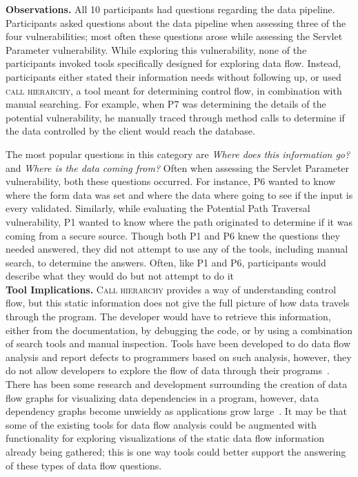 \documentclass[conference]{IEEEtran}
\begin{document}
\noindent\textbf{Observations.}
All 10 participants had questions regarding the data pipeline.
Participants asked questions about the data pipeline when assessing three of the four vulnerabilities; most often these questions arose while assessing the Servlet Parameter vulnerability. 
While exploring this vulnerability, none of the participants invoked tools specifically designed for exploring data flow. 
Instead, participants either stated their information needs without following up, or used \textsc{call hierarchy}, a tool meant for determining control flow, in combination with manual searching.
For example, when P7 was determining the details of the potential vulnerability, he manually traced through method calls to determine if the data controlled by the client would reach the database.

The most popular questions in this category are \textit{Where does this information go?} and \textit{Where is the data coming from?} 
Often when assessing the Servlet Parameter vulnerability, both these questions occurred. 
For instance, P6 wanted to know where the form data was set and where the data where going to see if the input is every validated.  
Similarly, while evaluating the Potential Path Traversal vulnerability, P1 wanted to know where the path originated to determine if it was coming from a secure source.
Though both P1 and P6 knew the questions they needed answered, they did not attempt to use any of the tools, including manual search, to determine the answers. %
Often, like P1 and P6, participants would describe what they would do but not attempt to do it
\\

\noindent\textbf{Tool Implications.}
\textsc{Call hierarchy} provides a way of understanding control flow, but this static information does not give the full picture of how data travels through the program. 
The developer would have to retrieve this information, either from the documentation, by debugging the code, or by using a combination of search tools and manual inspection. 
Tools have been developed to do data flow analysis and report defects to programmers based on such analysis, however, they do not allow developers to explore the flow of data through their programs~\cite{jovanovic2006pixy}. 
There has been some research and development surrounding the creation of data flow graphs for visualizing data dependencies in a program, however, data dependency graphs become unwieldy as applications grow large~\cite{ghosh2001method, ferrante1987program}. 
It may be that some of the existing tools for data flow analysis could be augmented with functionality for exploring visualizations of the static data flow information already being gathered; this is one way tools could better support the answering of these types of data flow questions.
\end{document}
